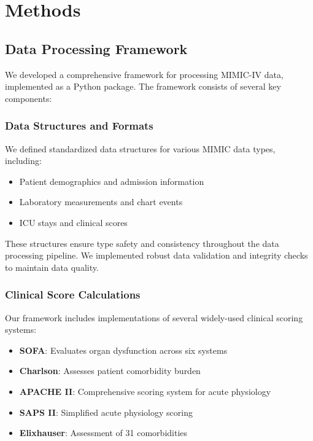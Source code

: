 \documentclass[12pt]{article}
\begin{document}
\section{Methods}

\subsection{Data Processing Framework}

We developed a comprehensive framework for processing MIMIC-IV data, implemented as a Python package. The framework consists of several key components:

\subsubsection{Data Structures and Formats}

We defined standardized data structures for various MIMIC data types, including:
\begin{itemize}
    \item Patient demographics and admission information
    \item Laboratory measurements and chart events
    \item ICU stays and clinical scores
\end{itemize}

These structures ensure type safety and consistency throughout the data processing pipeline. We implemented robust data validation and integrity checks to maintain data quality.

\subsubsection{Clinical Score Calculations}

Our framework includes implementations of several widely-used clinical scoring systems:
\begin{itemize}
    \item \textbf{SOFA}: Evaluates organ dysfunction across six systems
    \item \textbf{Charlson}: Assesses patient comorbidity burden
    \item \textbf{APACHE II}: Comprehensive scoring system for acute physiology
    \item \textbf{SAPS II}: Simplified acute physiology scoring
    \item \textbf{Elixhauser}: Assessment of 31 comorbidities
\end{itemize}
\end{document}
